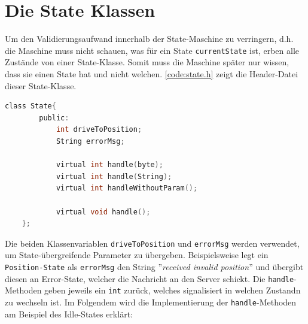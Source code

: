 \section{Die State Klassen}
Um den Validierungsaufwand innerhalb der State-Maschine zu verringern, d.h. die Maschine muss nicht schauen, was für ein State \texttt{currentState} ist, erben alle Zustände von einer State-Klasse. Somit muss die Maschine später nur wissen, dass sie einen State hat und nicht welchen.
\autoref{code:state.h} zeigt die Header-Datei dieser State-Klasse.

\begin{lstlisting}[language=c, style=dhpaperdefault]
	class State{
		public:
			int driveToPosition;
			String errorMsg;

			virtual int handle(byte);
			virtual int handle(String);
			virtual int handleWithoutParam();
			
			virtual void handle();
	};
\end{lstlisting}

Die beiden Klassenvariablen \texttt{driveToPosition} und \texttt{errorMsg} werden verwendet, um State-übergreifende Parameter zu übergeben. Beispielsweise legt ein \texttt{Position-State} als \texttt{errorMsg} den String ''\textit{received invalid position}'' und übergibt diesen an Error-State, welcher die Nachricht an den Server schickt.
Die \texttt{handle}-Methoden geben jeweils ein \texttt{int} zurück, welches signalisiert in welchen Zustandn zu wechseln ist.
Im Folgendem wird die Implementierung der \texttt{handle}-Methoden am Beispiel des Idle-States erklärt:

